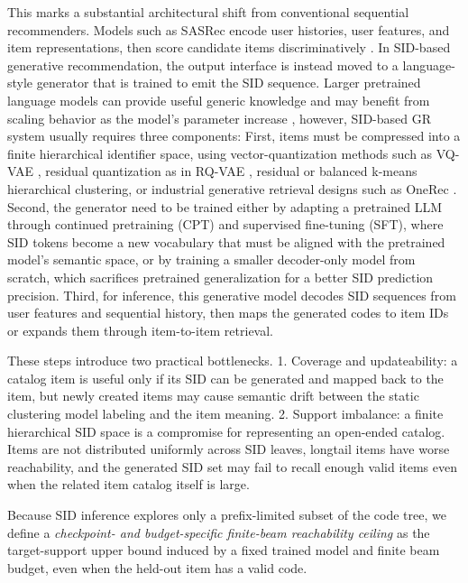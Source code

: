 \documentclass[letterpaper]{article}
\newcommand{\hx}[1]{\textcolor{red}{[HX: #1]}}
\begin{document}
This marks a substantial architectural shift from conventional sequential recommenders. Models such as SASRec encode user histories, user features, and item representations, then score candidate items discriminatively \citep{kang2018sasrec}. In SID-based generative recommendation, the output interface is instead moved to a language-style generator that is trained to emit the SID sequence. Larger pretrained language models can provide useful generic knowledge and may benefit from scaling behavior as the model's parameter increase \citep{kaplan2020scaling}, however, SID-based GR system usually requires three components: First, items must be compressed into a finite hierarchical identifier space, using vector-quantization methods such as VQ-VAE \citep{vandenoord2017vqvae}, residual quantization as in RQ-VAE \citep{lee2022rqvae}, residual or balanced k-means hierarchical clustering, or industrial generative retrieval designs such as OneRec \citep{deng2025onerec}. Second, the generator need to be trained either by adapting a pretrained LLM through continued pretraining (CPT) and supervised fine-tuning (SFT), where SID tokens become a new vocabulary that must be aligned with the pretrained model's semantic space, or by training a smaller decoder-only model from scratch, which sacrifices pretrained generalization for a better SID prediction precision. Third, for inference, this generative model decodes SID sequences from user features and sequential history, then maps the generated codes to item IDs or expands them through item-to-item retrieval. 

These steps introduce two practical bottlenecks. 1. Coverage and updateability: a catalog item is useful only if its SID can be generated and mapped back to the item, but newly created items may cause semantic drift between the static clustering model labeling and the item meaning. 2. Support imbalance: a finite hierarchical SID space is a compromise for representing an open-ended catalog. Items are not distributed uniformly across SID leaves, longtail items have worse reachability, and the generated SID set may fail to recall enough valid items even when the related item catalog itself is large.

Because SID inference explores only a prefix-limited subset of the code tree,
we define a \emph{checkpoint- and budget-specific finite-beam reachability
ceiling} as the target-support upper bound induced by a fixed trained model and finite beam budget, even when
the held-out item has a valid code.
\end{document}
